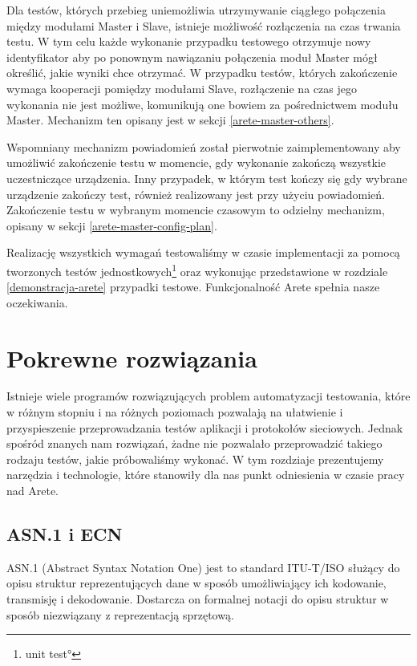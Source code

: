 \documentclass[00-praca-magisterska.tex]{subfiles}
\begin{document}
Dla testów, których przebieg uniemożliwia utrzymywanie ciągłego połączenia
między modułami Master i Slave, istnieje możliwość rozłączenia na czas trwania
testu. W tym celu każde wykonanie przypadku testowego otrzymuje nowy
identyfikator aby po ponownym nawiązaniu połączenia moduł Master mógł określić,
jakie wyniki chce otrzymać. W przypadku testów, których zakończenie wymaga
kooperacji pomiędzy modułami Slave, rozłączenie na czas jego wykonania nie jest
możliwe, komunikują one bowiem za pośrednictwem modułu Master. Mechanizm ten
opisany jest w sekcji \ref{arete-master-others}.

Wspomniany mechanizm powiadomień został pierwotnie zaimplementowany aby
umożliwić zakończenie testu w momencie, gdy wykonanie zakończą wszystkie
uczestniczące urządzenia. Inny przypadek, w którym test kończy się gdy wybrane
urządzenie zakończy test, również realizowany jest przy użyciu powiadomień.
Zakończenie testu w wybranym momencie czasowym to odzielny mechanizm, opisany w
sekcji \ref{arete-master-config-plan}.

Realizację wszystkich wymagań testowaliśmy w czasie implementacji za pomocą
tworzonych testów jednostkowych\footnote{\ang{unit test}} oraz wykonując
przedstawione w rozdziale \ref{demonstracja-arete} przypadki testowe.
Funkcjonalność Arete spełnia nasze oczekiwania.

\section{Pokrewne rozwiązania}
\label{dostepne-rozwiazania}

Istnieje wiele programów rozwiązujących problem automatyzacji testowania, które
w różnym stopniu i na różnych poziomach pozwalają na ułatwienie i przyspieszenie
przeprowadzania testów aplikacji i protokołów sieciowych. Jednak spośród znanych
nam rozwiązań, żadne nie pozwalało przeprowadzić takiego rodzaju testów, jakie
próbowaliśmy wykonać. W tym rozdziaje prezentujemy narzędzia i technologie,
które stanowiły dla nas punkt odniesienia w czasie pracy nad Arete.

\subsection{ASN.1 i ECN}
\label{asn}
ASN.1 (Abstract Syntax Notation One) jest to standard ITU-T/ISO służący do opisu
struktur reprezentujących dane w sposób umożliwiający ich kodowanie, transmisję
i dekodowanie. Dostarcza on formalnej notacji do opisu struktur w sposób
niezwiązany z reprezentacją sprzętową.
\end{document}
